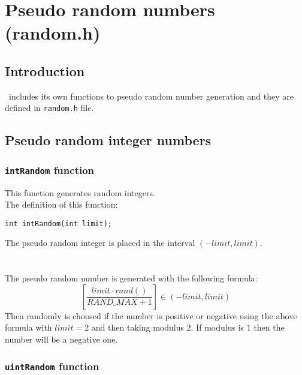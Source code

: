 %
%

\chapter{Pseudo random numbers (random.h)} \label{ch:random}

\section{Introduction}

\BI \ includes its own functions to pseudo random number generation and they are defined in \texttt{random.h} file.\\


\section{Pseudo random integer numbers}

\subsection{\texttt{intRandom} function} \label{sec:intRandom}

This function generates random integers.\\

The definition of this function:
%
\begin{verbatim}
int intRandom(int limit);  
\end{verbatim}
%
The pseudo random integer is placed in the interval $(-limit,limit)$.\\ \\
%
%
\ \\
%
The pseudo random number is generated with the following formula:
%
\begin{displaymath}
\left[ \frac{limit \cdot rand()}{RAND\_MAX + 1} \right] \in (-limit,limit)
\end{displaymath}
%
Then randomly is choosed if the number is positive or negative using the above formula with $limit=2$ and then taking modulus $2$. If modulus is $1$ then the number will be a negative one.

\subsection{\texttt{uintRandom} function} \label{sec:uintRandom}

